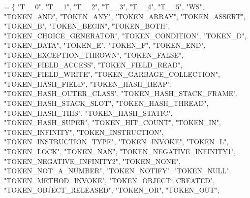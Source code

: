 \begin{DoxyCode}
= \{
    \textcolor{stringliteral}{"T\_\_0"}, \textcolor{stringliteral}{"T\_\_1"}, \textcolor{stringliteral}{"T\_\_2"}, \textcolor{stringliteral}{"T\_\_3"}, \textcolor{stringliteral}{"T\_\_4"}, \textcolor{stringliteral}{"T\_\_5"}, \textcolor{stringliteral}{"WS"}, \textcolor{stringliteral}{"TOKEN\_AND"}, \textcolor{stringliteral}{"TOKEN\_ANY"}, 
    \textcolor{stringliteral}{"TOKEN\_ARRAY"}, \textcolor{stringliteral}{"TOKEN\_ASSERT"}, \textcolor{stringliteral}{"TOKEN\_B"}, \textcolor{stringliteral}{"TOKEN\_BEGIN"}, \textcolor{stringliteral}{"TOKEN\_BOTH"}, 
    \textcolor{stringliteral}{"TOKEN\_CHOICE\_GENERATOR"}, \textcolor{stringliteral}{"TOKEN\_CONDITION"}, \textcolor{stringliteral}{"TOKEN\_D"}, \textcolor{stringliteral}{"TOKEN\_DATA"}, 
    \textcolor{stringliteral}{"TOKEN\_E"}, \textcolor{stringliteral}{"TOKEN\_F"}, \textcolor{stringliteral}{"TOKEN\_END"}, \textcolor{stringliteral}{"TOKEN\_EXCEPTION\_THROWN"}, \textcolor{stringliteral}{"TOKEN\_FALSE"}, 
    \textcolor{stringliteral}{"TOKEN\_FIELD\_ACCESS"}, \textcolor{stringliteral}{"TOKEN\_FIELD\_READ"}, \textcolor{stringliteral}{"TOKEN\_FIELD\_WRITE"}, \textcolor{stringliteral}{"TOKEN\_GARBAGE\_COLLECTION"}, 
    \textcolor{stringliteral}{"TOKEN\_HASH\_FIELD"}, \textcolor{stringliteral}{"TOKEN\_HASH\_HEAP"}, \textcolor{stringliteral}{"TOKEN\_HASH\_OUTER\_CLASS"}, \textcolor{stringliteral}{"TOKEN\_HASH\_STACK\_FRAME"}, 
    \textcolor{stringliteral}{"TOKEN\_HASH\_STACK\_SLOT"}, \textcolor{stringliteral}{"TOKEN\_HASH\_THREAD"}, \textcolor{stringliteral}{"TOKEN\_HASH\_THIS"}, \textcolor{stringliteral}{"TOKEN\_HASH\_STATIC"}, 
    \textcolor{stringliteral}{"TOKEN\_HASH\_SUPER"}, \textcolor{stringliteral}{"TOKEN\_HIT\_COUNT"}, \textcolor{stringliteral}{"TOKEN\_IN"}, \textcolor{stringliteral}{"TOKEN\_INFINITY"}, \textcolor{stringliteral}{"TOKEN\_INSTRUCTION"}, 
    \textcolor{stringliteral}{"TOKEN\_INSTRUCTION\_TYPE"}, \textcolor{stringliteral}{"TOKEN\_INVOKE"}, \textcolor{stringliteral}{"TOKEN\_L"}, \textcolor{stringliteral}{"TOKEN\_LOCK"}, \textcolor{stringliteral}{"TOKEN\_NAN"}, 
    \textcolor{stringliteral}{"TOKEN\_NEGATIVE\_INFINITY1"}, \textcolor{stringliteral}{"TOKEN\_NEGATIVE\_INFINITY2"}, \textcolor{stringliteral}{"TOKEN\_NONE"}, 
    \textcolor{stringliteral}{"TOKEN\_NOT\_A\_NUMBER"}, \textcolor{stringliteral}{"TOKEN\_NOTIFY"}, \textcolor{stringliteral}{"TOKEN\_NULL"}, \textcolor{stringliteral}{"TOKEN\_METHOD\_INVOKE"}, 
    \textcolor{stringliteral}{"TOKEN\_OBJECT\_CREATED"}, \textcolor{stringliteral}{"TOKEN\_OBJECT\_RELEASED"}, \textcolor{stringliteral}{"TOKEN\_OR"}, \textcolor{stringliteral}{"TOKEN\_OUT"}, 

\end{DoxyCode}
